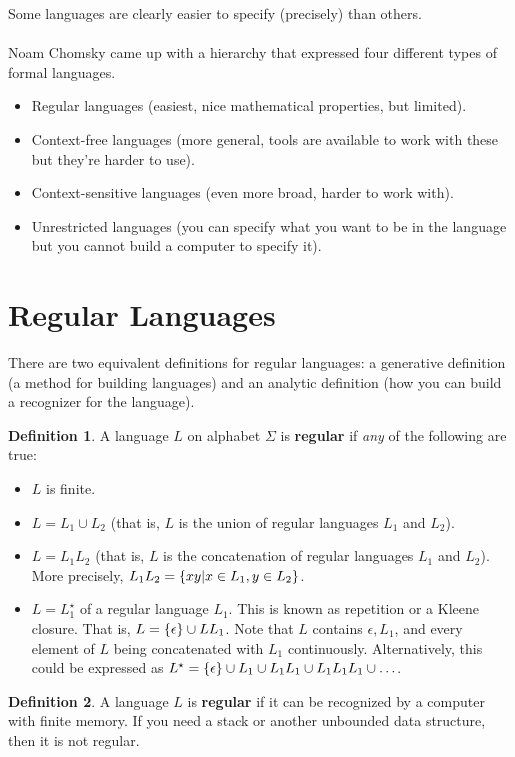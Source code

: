 \documentclass[]{article}
\DeclarePairedDelimiter{\set}{\lbrace}{\rbrace}
\theoremstyle{definition}
\newtheorem*{defn}{Definition}
\begin{document}
		Some languages are clearly easier to specify (precisely) than others.
		\\ \\	
		Noam Chomsky came up with a hierarchy that expressed four different types of formal languages.
		\begin{itemize}
			\item Regular languages (easiest, nice mathematical properties, but limited).
			\item Context-free languages (more general, tools are available to work with these but they're harder to use).
			\item Context-sensitive languages (even more broad, harder to work with).
			\item Unrestricted languages (you can specify what you want to be in the language but you cannot build a computer to specify it).
		\end{itemize}

	\section{Regular Languages}
		There are two equivalent definitions for regular languages: a generative definition (a method for building languages) and an analytic definition (how you can build a recognizer for the language).
		\begin{defn}
			A language $L$ on alphabet $\Sigma$ is \textbf{regular} if \emph{any} of the following are true:
			\begin{itemize}
				\item $L$ is finite.
				\item $L = L_1 \cup L_2$ (that is, $L$ is the union of regular languages $L_1$ and $L_2$).
				\item $L = L_1 L_2$ (that is, $L$ is the concatenation of regular languages $L_1$ and $L_2$). More precisely, $L_1 L_2 = \set{xy | x \in L_1, y \in L_2}$.
				\item $L = L_1^\star$ of a regular language $L_1$. This is known as repetition or a Kleene closure. That is, $L = \set{\epsilon} \cup L L_1$. Note that $L$ contains $\epsilon, L_1$, and every element of $L$ being concatenated with $L_1$ continuously. Alternatively, this could be expressed as $L^\star = \set{\epsilon} \cup L_1 \cup L_1 L_1 \cup L_1 L_1 L_1 \cup \ldots$.
			\end{itemize}
		\end{defn}

		\begin{defn}
			A language $L$ is \textbf{regular} if it can be recognized by a computer with finite memory. If you need a stack or another unbounded data structure, then it is not regular.
		\end{defn}
\end{document}
